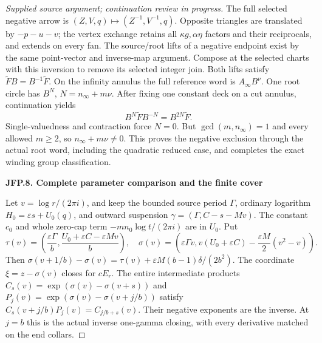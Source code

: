 \begin{proof}[Supplied source argument; continuation review in progress]
The full selected negative arrow is
\((Z,V,q)\mapsto(Z^{-1},V^{-1},q)\). Opposite triangles are
translated by \(-p-u-v\); the vertex exchange retains all
\(\kappa g,\alpha\eta\) factors and their reciprocals, and
extends on every fan. The source/root lifts of a negative
endpoint exist by the same point-vector and inverse-map
argument. Compose at the selected charts with this inversion
to remove its selected integer join. Both lifts satisfy
\(\widetilde F B=B^{-1}\widetilde F\). On the infinity annulus
the full reference word is \(A_\infty B^\nu\). One root circle
has \(B^N\), \(N=n_\infty+m\nu\). After fixing one constant
deck on a cut annulus, continuation yields
\[
 B^N\widetilde F B^{-N}=B^{2N}\widetilde F.
\tag{JFP.35}
\]
Single-valuedness and contraction force \(N=0\). But
\(\gcd(m,n_\infty)=1\) and every allowed \(m\ge2\), so
\(n_\infty+m\nu\ne0\). This proves the negative exclusion
through the actual root word, including the quadratic reduced
case, and completes the exact winding group classification.

\par

\medskip\noindent\textbf{JFP.8. Complete parameter comparison and the finite cover}

\par\nobreak

Let \(v=\log r/(2\pi i)\), and keep the bounded source period
\(\Gamma\), ordinary logarithm \(H_0=\varepsilon s+U_0(q)\),
and outward suspension \(\gamma=(\Gamma,C-s-Mv)\).
The constant \(c_0\) and whole zero-cap term
\(-mn_0\log t/(2\pi i)\) are in \(U_0\). Put
\[
 \tau(v)=\left(\frac{\varepsilon\Gamma}{b},
 \frac{U_0+\varepsilon C-\varepsilon Mv}{b}\right),
 \quad
 \sigma(v)=\left(\varepsilon\Gamma v,
 v(U_0+\varepsilon C)-\frac{\varepsilon M}{2}(v^2-v)\right).
\tag{JFP.36}
\]
Then \(\sigma(v+1/b)-\sigma(v)=\tau(v)+
\varepsilon M(b-1)\delta/(2b^2)\). The coordinate
\(\xi=z-\sigma(v)\) closes for \(cE_r\). The entire
intermediate products
\(C_s(v)=\exp(\sigma(v)-\sigma(v+s))\) and
\(P_j(v)=\exp(\sigma(v)-\sigma(v+j/b))\) satisfy
\(C_s(v+j/b)P_j(v)=C_{j/b+s}(v)\).
Their negative exponents are the inverse. At \(j=b\) this
is the actual inverse one-gamma closing, with every derivative
matched on the end collars.


\end{proof}
